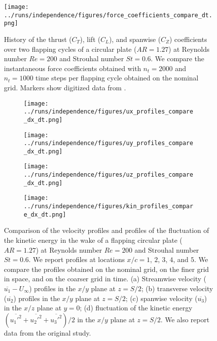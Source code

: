 \begin{figure}
  \centering
  \texttt{[image: ../runs/independence/figures/force\_coefficients\_compare\_dt.png]}
  \caption{History of the thrust ($C_T$), lift ($C_L$), and spanwise ($C_Z$) coefficients over two flapping cycles of a circular plate ($AR = 1.27$) at Reynolds number $Re = 200$ and Strouhal number $St = 0.6$. We compare the instantaneous force coefficients obtained with $n_t = 2000$ and $n_t = 1000$ time steps per flapping cycle obtained on the nominal grid. Markers show digitized data from \citet{li_dong_2016}.}
  \label{fig:independence_force_coefficients_dt}
\end{figure}

\begin{figure}
  \centering
  \begin{subfigure}[c]{0.45\textwidth}
    \centering
    \texttt{[image: ../runs/independence/figures/ux\_profiles\_compare\_dx\_dt.png]}
    \caption{}
  \end{subfigure}
  \hfill
  \begin{subfigure}[c]{0.45\textwidth}
    \centering
    \texttt{[image: ../runs/independence/figures/uy\_profiles\_compare\_dx\_dt.png]}
    \caption{}
  \end{subfigure}
  \vspace{1cm}
  \begin{subfigure}[c]{0.45\textwidth}
    \centering
    \texttt{[image: ../runs/independence/figures/uz\_profiles\_compare\_dx\_dt.png]}
    \caption{}
  \end{subfigure}
  \hfill
  \begin{subfigure}[c]{0.45\textwidth}
    \centering
    \texttt{[image: ../runs/independence/figures/kin\_profiles\_compare\_dx\_dt.png]}
    \caption{}
  \end{subfigure}
  \caption{Comparison of the velocity profiles and profiles of the fluctuation of the kinetic energy in the wake of a flapping circular plate ($AR = 1.27$) at Reynolds number $Re = 200$ and Strouhal number $St = 0.6$. We report profiles at locations $x / c = 1$, $2$, $3$, $4$, and $5$. We compare the profiles obtained on the nominal grid, on the finer grid in space, and on the coarser grid in time. (a) Streamwise velocity ($\overline{u_1} - U_\infty$) profiles in the $x/y$ plane at $z = S / 2$; (b) transverse velocity ($\overline{u_2}$) profiles in the $x/y$ plane at $z = S / 2$; (c) spanwise velocity ($\overline{u_3}$) in the $x/z$ plane at $y = 0$; (d) fluctuation of the kinetic energy $( \overline{{u_1'}^2} + \overline{{u_2'}^2} + \overline{{u_3'}^2} ) / 2$ in the $x/y$ plane at $z = S / 2$. We also report data from the original study.\supercite{li_dong_2016}}
  \label{fig:independence_profiles}
\end{figure}


